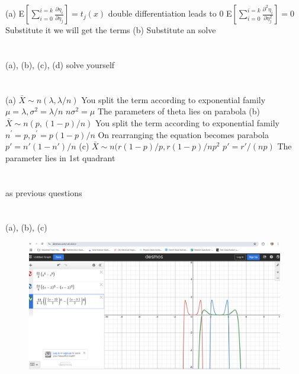 \documentclass{report}
\begin{document}
\section{}
(a) E$\left[\sum\limits_{i=0}^{i=k}\frac{\partial \eta_{i}}{\partial \eta_{j}}\right] = t_{j}(x)$
double differentiation leads to 0
\newline
E$\left[\sum\limits_{i=0}^{i=k}\frac{\partial^2 \eta_{i}}{\partial \eta_{j}^2}\right] = 0$
Substitute it we will get the terms
\newline
(b) Substitute an solve
\newline
\section{} 
(a), (b), (c), (d) solve yourself
\newline
\section{}
(a) $\bar{X} \sim n(\lambda, \lambda/n)$
You split the term according to exponential family
\newline
$\mu = \lambda, \sigma^2 = \lambda/n$
\newline
$n\sigma^2 = \mu$
\newline
The parameters of theta lies on parabola
\newline
(b) $\bar{X} \sim n(p, (1 - p)/n)$ You split the term according to exponential family
\newline
$n^{'} = p, p^{'} = p(1- p)/n$
\newline
On rearranging the equation becomes parabola
$p' = n'(1 - n')/n$
\newline
(c) $\bar{X} \sim n(r(1 - p)/p, r(1-p)/np^2$
\newline
$p' = r'/(np)$
\newline
The parameter lies in 1st quadrant
\newline
\section{}
as previous questions
\newline

\section{}
(a), (b), (c)
\begin{figure}
	\centering
	\includegraphics[width=0.7\linewidth]{screenshot001}
	\caption{}
	\label{fig:screenshot001}
\end{figure}
\newline
\end{document}
